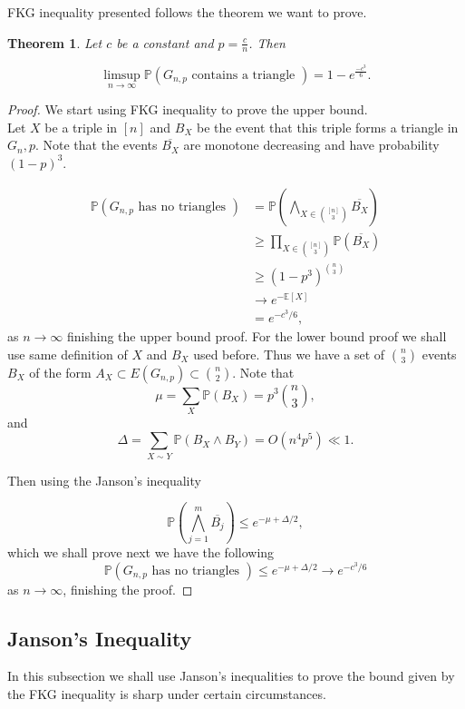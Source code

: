 \documentclass[12pt,twoside,a4paper]{book}
\numberwithin{equation}{section}
\newtheorem{theorem}             {Theorem}[section]
\theoremstyle{remark}
\begin{document}
FKG inequality presented follows the theorem we want to prove.
\begin{theorem} \label{theo:FKG}
Let $c$ be a constant and $p = \frac{c}{n}$. Then

$$ \limsup_{n \rightarrow \infty}\mathbb{P}(G_{n,p}\text{ contains a triangle }) = 1 - e^{\frac{-c^3}{6}}.$$
\end{theorem}
\begin{proof}

We start using FKG inequality to prove the upper bound.\\
Let $X$ be a triple in $[n]$ and $B_X$ be the event that this triple forms a triangle in $G_n,p$. Note that the events $\overline{B_X}$ are monotone decreasing and have probability $(1-p)^3$.

\begin{align*}
\mathbb{P}(G_{n,p} \text{ has no triangles }) &= \mathbb{P}\left( \bigwedge_{X \in \binom{[n]}{3}} \overline{B_X}\right) \\
& \geq \prod_{X \in \binom{[n]}{3}} \mathbb{P}(\overline{B_X})\\
& \geq (1-p^3)^{\binom{n}{3}}\\
& \rightarrow e^{-\mathbb{E}[X]}\\
& = e^{-c^3/6},
\end{align*}
as $n \rightarrow \infty$ finishing the upper bound proof. For the lower bound proof we shall use same definition of $X$ and $B_X$ used before. Thus we have a set of $\binom{n}{3}$ events $B_X$ of the form $A_X \subset E(G_{n,p}) \subset \binom{n}{2}$.
Note that 
$$\mu = \sum_X \mathbb{P} (B_X) = p^3\binom {n}{3},$$
and
$$\Delta = \sum_{X\sim Y} \mathbb{P}(B_X \wedge B_Y) = O(n^4 p^5) \ll 1.$$

Then using the Janson's inequality 

$$ \mathbb{P}\left(\bigwedge_{j=1}^m \overline{B_j}\right) \leq e^{-\mu + \Delta/2}, $$
which we shall prove next we have the following 
$$ \mathbb{P}(G_{n,p}\text{ has no triangles }) \leq e^{-\mu + \Delta/2} \rightarrow e^{-c^3/6}$$
as $n \rightarrow \infty$, finishing the proof.
\end{proof}

\subsection{Janson's Inequality}

In this subsection we shall use Janson's inequalities to prove the bound given by the FKG inequality is sharp under certain circumstances.\\
\end{document}
